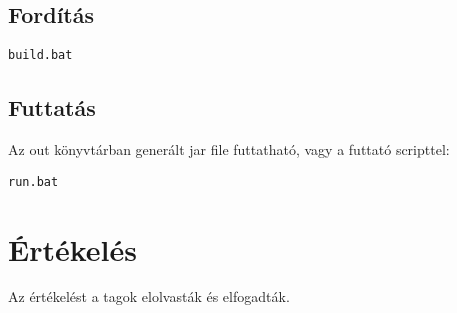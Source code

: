 \subsection{Fordítás}

\lstset{escapeinside=`', xleftmargin=10pt, frame=single, basicstyle=\ttfamily\footnotesize, language=sh}
\begin{lstlisting}
build.bat
\end{lstlisting}

\subsection{Futtatás}
Az out könyvtárban generált jar file futtatható, vagy a futtató scripttel:
\lstset{escapeinside=`', xleftmargin=10pt, frame=single, basicstyle=\ttfamily\footnotesize, language=sh}
\begin{lstlisting}
run.bat
\end{lstlisting}

\section{Értékelés}

Az értékelést a tagok elolvasták és elfogadták.

\begin{ertekeles}
\end{ertekeles}


